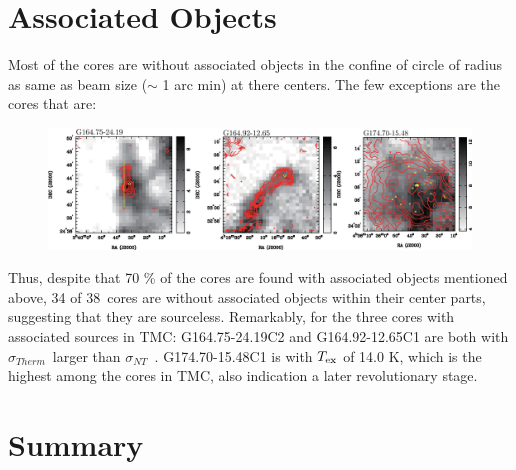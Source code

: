 \documentclass{article}
\newcommand{\texc}{$T_{\rm {ex}}$ }
\newcommand{\sigmath}{$\sigma _{Therm}$\ }
\newcommand{\sigmant}{$\sigma _{NT}$\ }
\newcommand{\numcore}{38\ }
\begin{document}
\section{Associated Objects}

Most of the cores are without associated objects in the confine of circle of radius as same as beam size ($\sim$ 1 arc min) at there centers. The few exceptions are the cores that are:
 \begin{figure}[h]
\includegraphics[totalheight=30mm]{Asso.eps}
\end{figure}

 Thus, despite that 70 \% of the cores are found with associated objects mentioned above, 34 of \numcore  cores are without associated objects within their center parts, suggesting that they are sourceless.
    Remarkably, for the three cores with associated sources in TMC: G164.75-24.19C2 and G164.92-12.65C1 are both with \sigmath larger than \sigmant . G174.70-15.48C1 is with \texc of 14.0 K, which is the highest among the cores in TMC, also indication a later revolutionary stage.

\section{Summary}
\end{document}
